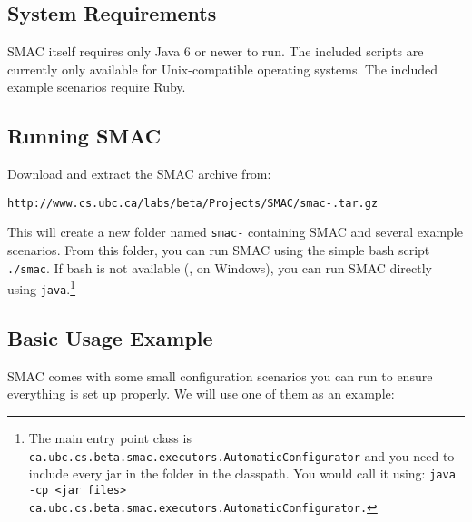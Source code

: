 \documentclass[11pt,letterpaper,twoside]{article}
\begin{document}
\subsection{System Requirements}

SMAC itself requires only Java 6 or newer to run. The included scripts are currently only available for Unix-compatible operating systems. The included example scenarios require Ruby. 

\subsection{Running SMAC}

Download and extract the SMAC archive from:

{\footnotesize
\begin{alltt}
http://www.cs.ubc.ca/labs/beta/Projects/SMAC/smac-\version{}\unskip.tar.gz
\end{alltt}}

This will create a new folder named \texttt{smac-\version} containing SMAC and several example scenarios. 
From this folder, you can run SMAC using the simple bash script \texttt{./smac}. If bash is not available (\eg{}, on Windows), you can run SMAC directly using \texttt{java}.\footnote{The main entry point class is {\scriptsize\texttt{ca.ubc.cs.beta.smac.executors.AutomaticConfigurator}} and you need to include every jar in the folder in the classpath. You would call it using: \texttt{java -cp <jar files> {ca.ubc.cs.beta.smac.executors.AutomaticConfigurator}.}}

\subsection{Basic Usage Example}

SMAC comes with some small configuration scenarios you can run to ensure everything is set up properly.
We will use one of them as an example:
\end{document}
